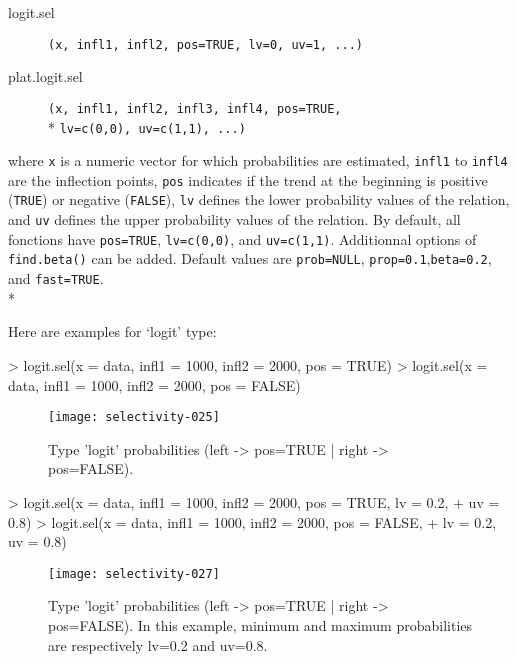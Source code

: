 \documentclass[letterpaper, 12pt]{article}
\begin{document}
\begin{description}
\item[logit.sel]\verb#(x, infl1, infl2, pos=TRUE, lv=0, uv=1, ...)#
\item[plat.logit.sel]\verb#(x, infl1, infl2, infl3, infl4, pos=TRUE,# \\* \verb#lv=c(0,0), uv=c(1,1), ...)#
\end{description}
where \verb#x# is a numeric vector for which probabilities are estimated, \verb#infl1# to \verb#infl4# are the inflection points,  \verb#pos# indicates if the trend at the beginning is positive  (\verb#TRUE#) or negative (\verb#FALSE#), \verb#lv# defines the 
lower probability values of the relation, and \verb#uv# defines the upper probability values of the relation. By default, 
all fonctions have \verb#pos=TRUE#, \verb#lv=c(0,0)#, and \verb#uv=c(1,1)#. Additionnal options of \verb#find.beta()# 
can be added. Default values are \verb#prob=NULL#, \verb#prop=0.1#,\verb#beta=0.2#, and \verb#fast=TRUE#.  \\*

Here are examples for `logit' type:
\begin{Schunk}
\begin{Sinput}
> logit.sel(x = data, infl1 = 1000, infl2 = 2000, pos = TRUE)
> logit.sel(x = data, infl1 = 1000, infl2 = 2000, pos = FALSE)
\end{Sinput}
\end{Schunk}
\begin{figure}[h]
\vspace{-20pt}
\begin{center}
\texttt{[image: selectivity-025]}
\end{center}
\vspace{-30pt}
\caption{Type 'logit' probabilities (left -> pos=TRUE |  right -> pos=FALSE).}
\vspace{-10pt}
\label{fig12}
\end{figure}

\vspace*{\fill}
\newpage


\begin{Schunk}
\begin{Sinput}
> logit.sel(x = data, infl1 = 1000, infl2 = 2000, pos = TRUE, lv = 0.2, 
+     uv = 0.8)
> logit.sel(x = data, infl1 = 1000, infl2 = 2000, pos = FALSE, 
+     lv = 0.2, uv = 0.8)
\end{Sinput}
\end{Schunk}

\begin{figure}[h]
\vspace{-20pt}
\begin{center}
\texttt{[image: selectivity-027]}
\end{center}
\vspace{-30pt}
\caption{Type 'logit' probabilities (left -> pos=TRUE |  right -> pos=FALSE). In this example, minimum and maximum probabilities are respectively lv=0.2 and uv=0.8.}
\vspace{-10pt}
\label{fig13}
\end{figure}
\end{document}
